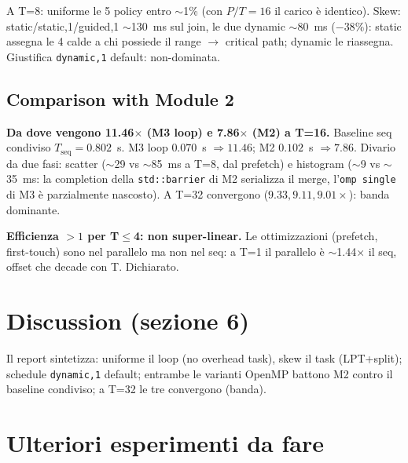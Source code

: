 \documentclass[11pt,a4paper]{article}
\begin{document}
\begin{difesa}
A T=8: uniforme le 5 policy entro $\sim$1\% (con $P/T=16$ il carico è identico). Skew: static/static,1/guided,1 $\sim$130~ms sul join, le due dynamic $\sim$80~ms ($-38\%$): static assegna le 4 calde a chi possiede il range $\to$ critical path; dynamic le riassegna. Giustifica \texttt{dynamic,1} default: non-dominata.
\end{difesa}

\subsection{Comparison with Module 2}

\begin{deriv}
\textbf{Da dove vengono 11.46$\times$ (M3 loop) e 7.86$\times$ (M2) a T=16.} Baseline seq condiviso $T_\text{seq}=0.802$~s. M3 loop $0.070$~s $\Rightarrow11.46$; M2 $0.102$~s $\Rightarrow7.86$. Divario da due fasi: scatter ($\sim$29 vs $\sim$85~ms a T=8, dal prefetch) e histogram ($\sim$9 vs $\sim$35~ms: la completion della \texttt{std::barrier} di M2 serializza il merge, l'\texttt{omp single} di M3 è parzialmente nascosto). A T=32 convergono ($9.33,9.11,9.01\times$): banda dominante.
\end{deriv}

\begin{difesa}
\textbf{Efficienza $>1$ per T$\le$4: non super-linear.} Le ottimizzazioni (prefetch, first-touch) sono nel parallelo ma non nel seq: a T=1 il parallelo è $\sim$1.44$\times$ il seq, offset che decade con T. Dichiarato.
\end{difesa}

\section{Discussion (sezione 6)}

Il report sintetizza: uniforme il loop (no overhead task), skew il task (LPT+split); schedule \texttt{dynamic,1} default; entrambe le varianti OpenMP battono M2 contro il baseline condiviso; a T=32 le tre convergono (banda).

\section{Ulteriori esperimenti da fare}
\end{document}
